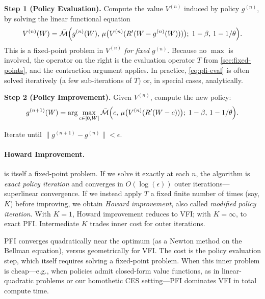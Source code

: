 \textbf{Step 1 (Policy Evaluation).} Compute the value $V^{(n)}$ induced by policy $g^{(n)}$, by solving the linear functional equation
\begin{equation}
V^{(n)}(W) = \bar{\mathcal{M}}\Big( g^{(n)}(W), \, \mu\big( V^{(n)}(R'(W - g^{(n)}(W))) \big); \; 1-\beta, \, 1-1/\theta \Big).
\label{eq:pfi-eval}
\end{equation}
This is a fixed-point problem in $V^{(n)}$ \emph{for fixed} $g^{(n)}$. Because no $\max$ is involved, the operator on the right is the evaluation operator $T$ from \cref{sec:fixed-points}, and the contraction argument applies. In practice, \cref{eq:pfi-eval} is often solved iteratively (a few sub-iterations of $T$) or, in special cases, analytically.

\textbf{Step 2 (Policy Improvement).} Given $V^{(n)}$, compute the new policy:
\begin{equation}
g^{(n+1)}(W) = \arg\max_{c \in [0, W]} \bar{\mathcal{M}}\Big( c, \, \mu\big( V^{(n)}(R'(W - c)) \big); \; 1-\beta, \, 1-1/\theta \Big).
\label{eq:pfi-improve}
\end{equation}

Iterate until $\|g^{(n+1)} - g^{(n)}\| < \epsilon$.

\paragraph{Howard Improvement.}
 is itself a fixed-point problem. If we solve it exactly at each $n$, the algorithm is \emph{exact policy iteration} and converges in $O(\log(\epsilon))$ outer iterations---superlinear convergence. If we instead apply $T$ a fixed finite number of times (say, $K$) before improving, we obtain \emph{Howard improvement}, also called \emph{modified policy iteration}. With $K = 1$, Howard improvement reduces to VFI; with $K = \infty$, to exact PFI. Intermediate $K$ trades inner cost for outer iterations.

\begin{calloutnote}
PFI converges quadratically near the optimum (as a Newton method on the Bellman equation), versus geometrically for VFI. The cost is the policy evaluation step, which itself requires solving a fixed-point problem. When this inner problem is cheap---e.g., when policies admit closed-form value functions, as in linear-quadratic problems or our homothetic CES setting---PFI dominates VFI in total compute time.
\end{calloutnote}

